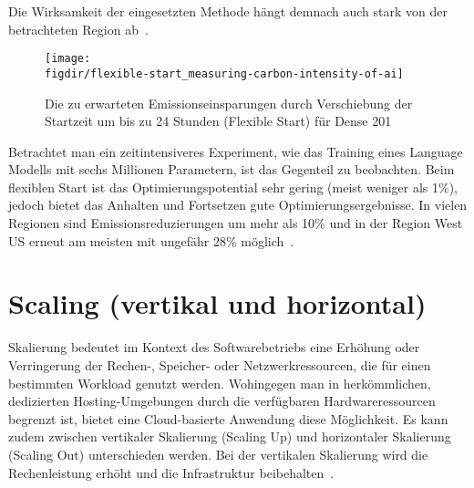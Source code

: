 Die Wirksamkeit der eingesetzten Methode hängt demnach auch stark von der betrachteten Region ab~\cite{Dodge.06212022}.
\begin{figure}
 \caption{Die zu erwarteten Emissionseinsparungen durch Verschiebung der Startzeit um bis zu 24 Stunden (Flexible Start) für Dense 201~\cite{Dodge.06212022}}
 {\texttt{[image: \\figdir/flexible-start\_measuring-carbon-intensity-of-ai]}}
 \label{FIG:flexible-start}
\end{figure}
Betrachtet man ein zeitintensiveres Experiment, wie das Training eines Language Modells mit sechs Millionen Parametern, ist das Gegenteil zu beobachten.
Beim flexiblen Start ist das Optimierungspotential sehr gering (meist weniger als 1\%), jedoch bietet das Anhalten und Fortsetzen gute Optimierungsergebnisse.
In vielen Regionen sind Emissionsreduzierungen um mehr als 10\% und in der Region West US erneut am meisten mit ungefähr 28\% möglich~\cite{Dodge.06212022}.

\section{Scaling (vertikal und horizontal)}
Skalierung bedeutet im Kontext des Softwarebetriebs eine Erhöhung oder Verringerung der Rechen-, Speicher- oder Netzwerkressourcen, die für einen bestimmten Workload genutzt werden.
Wohingegen man in herkömmlichen, dedizierten Hosting-Umgebungen durch die verfügbaren Hardwareressourcen begrenzt ist, bietet eine Cloud-basierte Anwendung diese Möglichkeit.
Es kann zudem zwischen vertikaler Skalierung (Scaling Up) und horizontaler Skalierung (Scaling Out) unterschieden werden.
Bei der vertikalen Skalierung wird die Rechenleistung erhöht und die Infrastruktur beibehalten~\cite{AlibabaCloudCommunity.20240118T09:19:15.000Z}.

